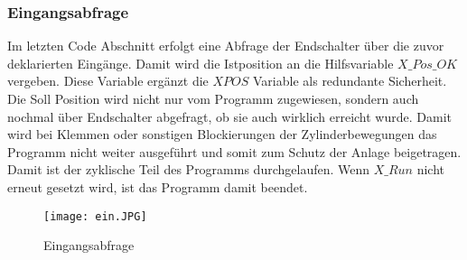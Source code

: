 \documentclass[12pt,a4paper]{scrartcl}	%
\begin{document}
\subsubsection{Eingangsabfrage}
Im letzten Code Abschnitt erfolgt eine Abfrage der Endschalter über die zuvor deklarierten Eingänge. Damit wird die Istposition an die Hilfsvariable $X\_Pos\_OK$ vergeben. Diese Variable ergänzt die $XPOS$ Variable als redundante Sicherheit. Die Soll Position wird nicht nur vom Programm zugewiesen, sondern auch nochmal über Endschalter abgefragt, ob sie auch wirklich erreicht wurde. Damit wird bei Klemmen oder sonstigen Blockierungen der Zylinderbewegungen das Programm nicht weiter ausgeführt und somit zum Schutz der Anlage beigetragen.\\
Damit ist der zyklische Teil des Programms durchgelaufen. Wenn $X\_Run$ nicht erneut gesetzt wird, ist das Programm damit beendet.
\begin{figure}[h]
	\centering
	\texttt{[image: ein.JPG]}
	\caption[Eingangsabfrage]{Eingangsabfrage}
	\label{ein}
\end{figure}

\newpage
\end{document}
